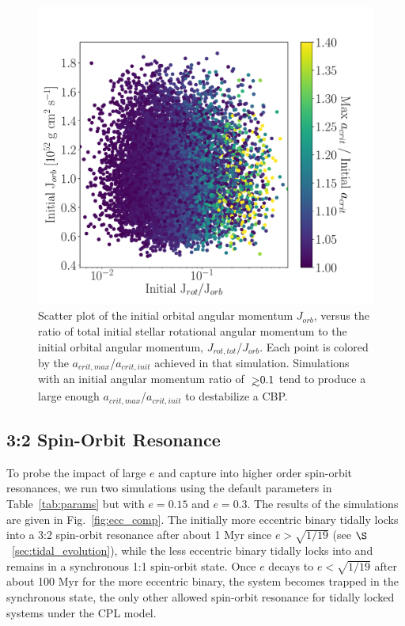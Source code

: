 \begin{figure}
	\includegraphics[width=\columnwidth]{mc_uniform.pdf}
    \caption{Scatter plot of the initial orbital angular momentum $J_{orb}$, versus the ratio of total initial stellar rotational angular momentum to the initial orbital angular momentum, $J_{rot,tot}$/$J_{orb}$.  Each point is colored by the $a_{crit,max}$/$a_{crit,init}$ achieved in that simulation.  Simulations with an initial angular momentum ratio of ${\gsim}0.1$ tend to produce a large enough $a_{crit,max}$/$a_{crit,init}$ to destabilize a CBP.}
    \label{fig:mc_uniform}
\end{figure}

\subsection{3:2 Spin-Orbit Resonance} \label{sec:32}

To probe the impact of large $e$ and capture into higher order spin-orbit resonances, we run two simulations using the default parameters in Table~\ref{tab:params} but with $e = 0.15$ and $e = 0.3$.  The results of the simulations are given in Fig.~\ref{fig:ecc_comp}.  The initially more eccentric binary tidally locks into a 3:2 spin-orbit resonance after about 1 Myr since $e > \sqrt{1/19}$ (see $\S$~\ref{sec:tidal_evolution}), while the less eccentric binary tidally locks into and remains in a synchronous 1:1 spin-orbit state.  Once $e$ decays to $e < \sqrt{1/19}$ after about 100 Myr for the more eccentric binary, the system becomes trapped in the synchronous state, the only other allowed spin-orbit resonance for tidally locked systems under the CPL model.

